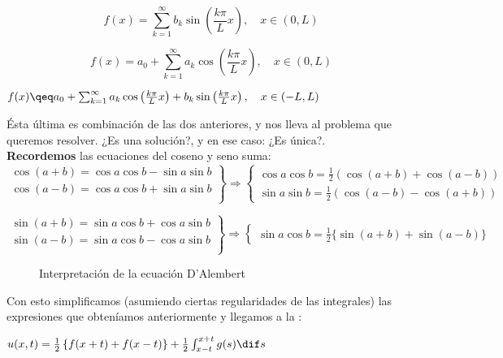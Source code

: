 		\[ f(x) = \sum_{k=1}^{\infty} b_k \sin \left( \frac{k \pi}{L} x \right), \quad x \in (0,L) \]

		\[ f(x) = a_0 + \sum^{\infty}_{k=1} a_k \cos \left( \frac{k \pi}{L} x \right), \quad x \in (0,L) \]

		\(
		f(x) \qeq a_0 + \sum^{\infty}_{k=1} a_k \cos \left( \frac{k \pi}{L} x \right) + b_k \sin \left( \frac{k \pi}{L} x \right), \quad x \in (-L,L)
		\)

		Ésta última es combinación de las dos anteriores, y nos lleva al problema que queremos resolver. ¿Es una solución?, y en ese caso: ¿Es única?.\\

		\textbf{Recordemos} las ecuaciones del coseno y seno suma:
		\[
		\left. \begin{array}{r}
			\cos (a + b) = \cos a \cos b - \sin a \sin b \\
			\cos (a - b) = \cos a \cos b + \sin a \sin b \\
		\end{array} \right\} \Rightarrow \left\{ \begin{array}{l}
			\cos a \cos b = \frac{1}{2} (\cos (a+b) + \cos (a-b)) \\
			\sin a \sin b = \frac{1}{2} (\cos (a-b) - \cos (a+b))
		\end{array} \right.
		\]

		\[
		\left. \begin{array}{r}
			\sin (a + b) = \sin a \cos b + \cos a \sin b \\
			\sin (a - b) = \sin a \cos b - \cos a \sin b \\
		\end{array} \right\} \Rightarrow \left\{ \begin{array}{l}
			\sin a \cos b = \frac{1}{2} \{\sin (a+b) + \sin(a-b)\}
		\end{array} \right.
		\]

		\begin{figure}[thbp]
		\centering
		\caption{Interpretación de la ecuación D'Alembert}
		\label{fig:interpretacionDalembert}
		\end{figure}

		Con esto simplificamos (asumiendo ciertas regularidades de las integrales) las expresiones que obteníamos anteriormente y llegamos a la :

		\(
		u(x,t) = \frac{1}{2} \left\{ f(x+t) + f(x-t) \right\} + \frac{1}{2} \int^{x+t}_{x-t} g(s) \dif s  \label{eq:DALEMBERT}\)


